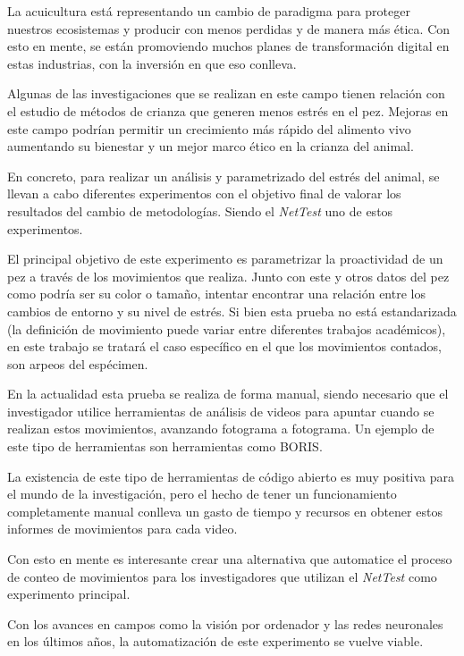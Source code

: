 La acuicultura está representando un cambio de paradigma para proteger nuestros ecosistemas y producir con menos perdidas y de manera más ética. Con esto en mente, se están 
promoviendo muchos planes de transformación digital en estas industrias, con la inversión en  que eso conlleva.

Algunas de las investigaciones que se realizan en este campo tienen relación con el estudio de métodos de crianza que generen menos estrés en el pez. Mejoras en este campo podrían 
permitir un crecimiento más rápido del alimento vivo aumentando su bienestar y un mejor marco ético en la crianza del animal.

En concreto, para realizar un análisis y parametrizado del estrés del animal, se llevan a cabo diferentes experimentos con el objetivo final de valorar los resultados del cambio de metodologías. 
Siendo el \textit{NetTest}\cite{barriossanchezPruebaRedEvaluando2023} uno de estos experimentos.

El principal objetivo de este experimento es parametrizar la proactividad de un pez a través de los movimientos que realiza. Junto con este y otros datos del pez como podría ser su color o tamaño, 
intentar encontrar una relación entre los cambios de entorno y su nivel de estrés. Si bien esta prueba no está estandarizada (la definición de movimiento puede variar entre diferentes 
trabajos académicos), en este trabajo se tratará el caso específico en el que los movimientos contados, son arpeos del espécimen.

En la actualidad esta prueba se realiza de forma manual, siendo necesario que el investigador utilice herramientas de análisis de videos para apuntar cuando se realizan estos movimientos, 
avanzando fotograma a fotograma. Un ejemplo de este tipo de herramientas son herramientas como BORIS\cite{friardBORISFreeVersatile2016}.

La existencia de este tipo de herramientas de código abierto es muy positiva para el mundo de la investigación, pero el hecho de tener un funcionamiento completamente manual conlleva un gasto 
de tiempo y recursos en obtener estos informes de movimientos para cada video.

Con esto en mente es interesante crear una alternativa que automatice el proceso de conteo de movimientos para los investigadores que utilizan el \textit{NetTest} como experimento principal. 

Con los avances en campos como la visión por ordenador y las redes neuronales en los últimos años, la automatización de este experimento se vuelve viable.

